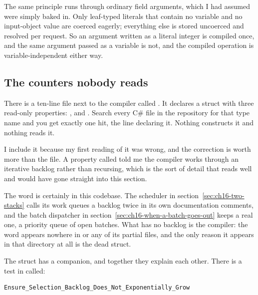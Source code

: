 %
The same principle runs through ordinary field arguments, which I had assumed
were simply baked in. Only leaf-typed literals that contain no variable and no
input-object value are coerced eagerly; everything else is stored uncoerced and
resolved per request. So an argument written as a literal integer is compiled
once, and the same argument passed as a variable is not, and the compiled
operation is variable-independent either way.

\subsection*{The counters nobody reads}

%
There is a ten-line file next to the compiler called
. It declares a struct with three read-only
properties: ,  and
. Search every C\# file in the repository for that type
name and you get exactly one hit, the line declaring it. Nothing constructs it
and nothing reads it.

I include it because my first reading of it was wrong, and the correction is
worth more than the file. A property called  told me the
compiler works through an iterative backlog rather than recursing, which is the
sort of detail that reads well and would have gone straight into this section.

The word is certainly in this codebase. The scheduler in
section~\ref{sec:ch16-two-stacks} calls its work queues a backlog twice in its
own documentation comments, and the batch dispatcher in
section~\ref{sec:ch16-when-a-batch-goes-out} keeps a real one, a priority queue
of open batches. What has no backlog is the compiler: the word appears nowhere
in  or any of its partial files, and the only reason
it appears in that directory at all is the dead struct.

%
The struct has a companion, and together they explain each other. There is a
test in  called:

\begin{verbatim}
Ensure_Selection_Backlog_Does_Not_Exponentially_Grow
\end{verbatim}

